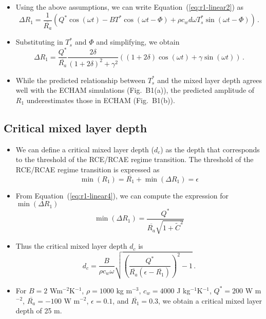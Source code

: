 \documentclass{ametsocV5}
\begin{document}
\begin{itemize}
\begin{enumerate}
        \end{enumerate}
  \item Using the above assumptions, we can write Equation~(\ref{eq:r1-linear2}) as
        \begin{equation} \label{eq:r1-linear3}
          \Delta R_{1} = \frac{1}{\overline{R_{a}}}\left(Q^{*}\cos(\omega t) -BT^{*}\cos(\omega t - \Phi)+\rho c_{w} d \omega T_{s}^{*}\sin(\omega t - \Phi) \right) \, .
        \end{equation}
  \item Substituting in $T_{s}^{*}$ and $\Phi$ and simplifying, we obtain
        \begin{equation} \label{eq:r1-linear4}
          \Delta R_{1} = \frac{Q^{*}}{\overline{R_{a}}}\frac{2\delta}{(1+2\delta)^{2}+\gamma^{2}}\left((1+2\delta)\cos(\omega t)+\gamma\sin(\omega t)\right) \, .
        \end{equation}
        \item While the predicted relationship between $T_{s}^{*}$ and the mixed layer depth agrees well with the ECHAM simulations (Fig.~B1(a)), the predicted amplitude of $R_{1}$ underestimates those in ECHAM (Fig.~B1(b)).
\end{itemize}

\subsection{Critical mixed layer depth}
\begin{itemize}
  \item We can define a critical mixed layer depth ($d_{c}$) as the depth that corresponds to the threshold of the RCE/RCAE regime transition. The threshold of the RCE/RCAE regime transition is expressed as
        \begin{equation}
          \min(R_{1}) = \overline{R_{1}} + \min(\Delta R_{1}) = \epsilon
        \end{equation}
  \item From Equation~(\ref{eq:r1-linear4}), we can compute the expression for $\min(\Delta R_{1})$
        \begin{equation}
          \min(\Delta R_{1}) = \frac{Q^{*}}{\overline{R_{a}}\sqrt{1+\tilde{C}^{2}}}
        \end{equation}
  \item Thus the critical mixed layer depth $d_{c}$ is
        \begin{equation}
          d_{c} = \frac{B}{\rho c_{w} \omega}\sqrt{\left(\frac{Q^{*}}{\overline{R_{a}}(\epsilon-\overline{R_{1}})}\right)^{2}-1} \, .
        \end{equation}
\item For $B=2$ Wm$^{-2}$K$^{-1}$, $\rho=1000$ kg m$^{-3}$, $c_{w}=4000$ J kg$^{-1} $K$^{-1}$, $Q^{*}=200$ W m$^{-2}$, $\overline{R_{a}}=-100$ W m$^{-2}$, $\epsilon=0.1$, and $\overline{R_{1}}=0.3$, we obtain a critical mixed layer depth of 25 m.

\end{itemize}
\end{document}
